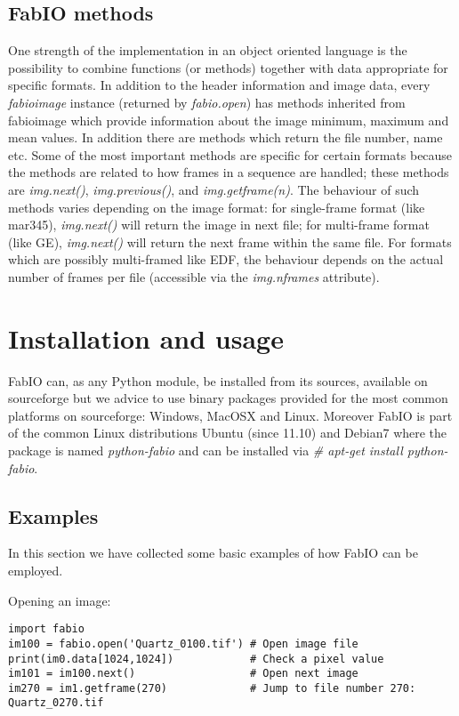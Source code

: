 \documentclass[preprint]{iucr}
\begin{document}
\subsection{FabIO methods}

One strength of the implementation in an object oriented language
is the possibility to combine functions (or methods) together with data
appropriate for specific formats.
In addition to the header information and image data, every {\em fabioimage}
instance (returned by {\em fabio.open}) has methods inherited from fabioimage 
which provide information about the image minimum, maximum and mean values.
In addition there are methods which return the file number, name etc. 
Some of the most important methods are specific for certain formats because 
the methods are related to how frames in a sequence are handled; these methods
are {\em img.next()}, {\em img.previous()}, and {\em img.getframe(n)}.
The behaviour of such methods varies depending on the
image format: for single-frame format (like mar345), {\em img.next()} will
return the image in next file; for multi-frame format (like GE), {\em
img.next()} will return the next frame within the same file. For formats which are possibly 
multi-framed like EDF, the behaviour depends on the actual number of frames per
file (accessible via the {\em img.nframes} attribute).


\section{Installation and usage}

FabIO can, as any Python module, be installed from its sources, available on 
sourceforge \cite{fabio} but we advice to use binary packages provided for the
most common platforms on sourceforge: Windows, MacOSX and Linux.
Moreover FabIO is part of the common Linux distributions Ubuntu (since 11.10)
and Debian7 where the package is named {\em python-fabio} and can be installed
via {\em \# apt-get install python-fabio}. 

\subsection{Examples}

In this section we have collected some basic examples of how FabIO can be employed. 

Opening an image:\\
\begin{verbatim}
import fabio     
im100 = fabio.open('Quartz_0100.tif') # Open image file
print(im0.data[1024,1024])            # Check a pixel value
im101 = im100.next()                  # Open next image
im270 = im1.getframe(270)             # Jump to file number 270: Quartz_0270.tif
\end{verbatim}
\end{document}
